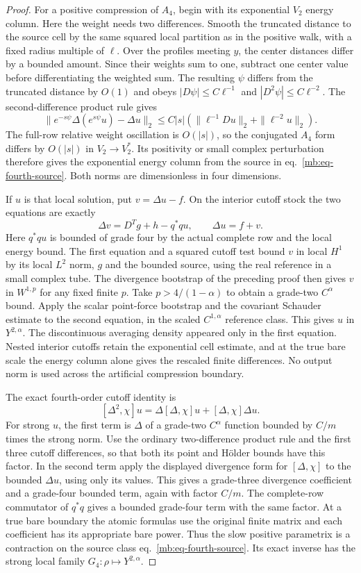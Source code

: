\documentclass[11pt,letterpaper,reqno]{amsart}
\numberwithin{equation}{section}
\renewcommand{\eqref}[1]{\textup{eq.~\ref{#1}}}
\theoremstyle{definition}
\theoremstyle{remark}
\begin{document}
\begin{proof}
For a positive compression of \(A_4\), begin with its exponential \(V_2\) energy column. Here the weight needs two differences. Smooth the truncated distance to the source cell by the same squared local partition as in the positive walk, with a fixed radius multiple of \(\ell\). Over the profiles meeting \(y\), the center distances differ by a bounded amount. Since their weights sum to one, subtract one center value before differentiating the weighted sum. The resulting \(\psi\) differs from the truncated distance by \(O(1)\) and obeys \(|D\psi|\le C\ell^{-1}\) and \(|D^2\psi|\le C\ell^{-2}\). The second-difference product rule gives
\[
 \|e^{-s\psi}\Delta(e^{s\psi}u)-\Delta u\|_2
     \le C|s|(\|\ell^{-1}Du\|_2+\|\ell^{-2}u\|_2).
\]
The full-row relative weight oscillation is \(O(|s|)\), so the conjugated \(A_4\) form differs by \(O(|s|)\) in \(V_2\to V_2^*\). Its positivity or small complex perturbation therefore gives the exponential energy column from the source in \eqref{mb:eq-fourth-source}. Both norms are dimensionless in four dimensions.

If \(u\) is that local solution, put \(v=\Delta u-f\). On the interior cutoff stock the two equations are exactly
\[
           \Delta v=D^Tg+h-q^*qu,\qquad \Delta u=f+v .
\]
Here \(q^*qu\) is bounded of grade four by the actual complete row and the local energy bound. The first equation and a squared cutoff test bound \(v\) in local \(H^1\) by its local \(L^2\) norm, \(g\) and the bounded source, using the real reference in a small complex tube. The divergence bootstrap of the preceding proof then gives \(v\) in \(W^{1,p}\) for any fixed finite \(p\). Take \(p>4/(1-\alpha)\) to obtain a grade-two \(C^\alpha\) bound. Apply the scalar point-force bootstrap and the covariant Schauder estimate to the second equation, in the scaled \(C^{1,\alpha}\) reference class. This gives \(u\) in \(Y^{2,\alpha}\). The discontinuous averaging density appeared only in the first equation. Nested interior cutoffs retain the exponential cell estimate, and at the true bare scale the energy column alone gives the rescaled finite differences. No output norm is used across the artificial compression boundary.

The exact fourth-order cutoff identity is
\[
 [\Delta^2,\chi]u=\Delta[\Delta,\chi]u+[\Delta,\chi]\Delta u .
\]
For strong \(u\), the first term is \(\Delta\) of a grade-two \(C^\alpha\) function bounded by \(C/m\) times the strong norm. Use the ordinary two-difference product rule and the first three cutoff differences, so that both its point and H\"older bounds have this factor. In the second term apply the displayed divergence form for \([\Delta,\chi]\) to the bounded \(\Delta u\), using only its values. This gives a grade-three divergence coefficient and a grade-four bounded term, again with factor \(C/m\). The complete-row commutator of \(q^*q\) gives a bounded grade-four term with the same factor. At a true bare boundary the atomic formulas use the original finite matrix and each coefficient has its appropriate bare power. Thus the slow positive parametrix is a contraction on the source class \eqref{mb:eq-fourth-source}. Its exact inverse has the strong local family \(G_4:\rho\mapsto Y^{2,\alpha}\).


\end{proof}
\end{document}
